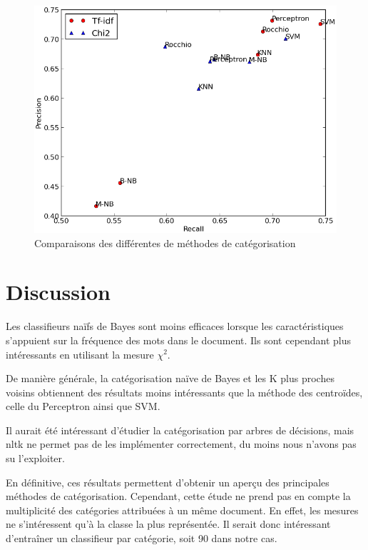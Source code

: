 \documentclass[a4paper,12pt]{article}
\begin{document}
		\begin{figure}[h!]
		\centering
		\includegraphics{graph.png}
		\caption{Comparaisons des différentes de méthodes de catégorisation}
		\end{figure}


	\section*{Discussion}

		Les classifieurs naïfs de Bayes sont moins efficaces lorsque les caractéristiques s'appuient sur la fréquence des mots dans le document. Ils sont cependant plus intéressants en utilisant la mesure $\chi^2$.

		De manière générale, la catégorisation naïve de Bayes et les K plus proches voisins obtiennent des résultats moins intéressants que la méthode des centroïdes, celle du Perceptron ainsi que SVM.

		Il aurait été intéressant d'étudier la catégorisation par arbres de décisions, mais nltk ne permet pas de les implémenter correctement, du moins nous n'avons pas su l'exploiter.

		En définitive, ces résultats permettent d'obtenir un aperçu des principales méthodes de catégorisation. Cependant, cette étude ne prend pas en compte la multiplicité des catégories attribuées à un même document. En effet, les mesures ne s'intéressent qu'à la classe la plus représentée. Il serait donc intéressant d'entraîner un classifieur par catégorie, soit 90 dans notre cas.
\end{document}
